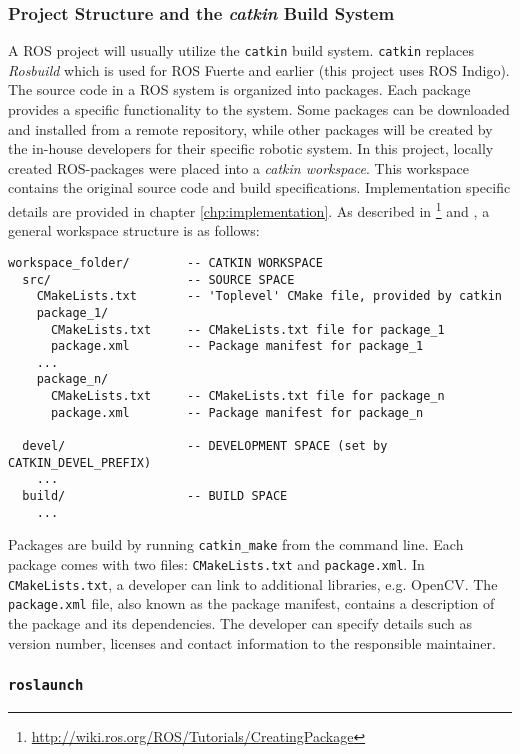 \subsubsection{Project Structure and the \textit{catkin} Build System}
\label{sec:catkin}
A \ac{ROS} project will usually utilize the \texttt{catkin} build system. \texttt{catkin} replaces \textit{Rosbuild} which is used for ROS Fuerte and earlier (this project uses \ac{ROS} Indigo). The source code in a \ac{ROS} system is organized into packages. Each package provides a specific functionality to the system. Some packages can be downloaded and installed from a remote repository, while other packages will be created by the in-house developers for their specific robotic system. In this project, locally created ROS-packages were placed into a \textit{catkin workspace}. This workspace contains the  original source code and build specifications. Implementation specific details are provided in chapter \ref{chp:implementation}. As described in \cite{ROS_tut_pkg}\footnote{\url{http://wiki.ros.org/ROS/Tutorials/CreatingPackage}} and \cite{ROS_catkin}, a general workspace structure is as follows:

\begin{verbatim}
workspace_folder/        -- CATKIN WORKSPACE
  src/                   -- SOURCE SPACE
    CMakeLists.txt       -- 'Toplevel' CMake file, provided by catkin
    package_1/
      CMakeLists.txt     -- CMakeLists.txt file for package_1
      package.xml        -- Package manifest for package_1
    ...
    package_n/
      CMakeLists.txt     -- CMakeLists.txt file for package_n
      package.xml        -- Package manifest for package_n
      
  devel/                 -- DEVELOPMENT SPACE (set by CATKIN_DEVEL_PREFIX)
    ...
  build/                 -- BUILD SPACE
    ...
\end{verbatim}

Packages are build by running \texttt{catkin\_make} from the command line. Each package comes with two files: \texttt{CMakeLists.txt} and \texttt{package.xml}. In \texttt{CMakeLists.txt}, a developer can link to additional libraries, e.g. \ac{OpenCV}. The \texttt{package.xml} file, also known as the package manifest, contains a description of the package and its dependencies. The developer can specify details such as version number, licenses and contact information to the responsible maintainer.

\subsubsection{\texttt{roslaunch}}


